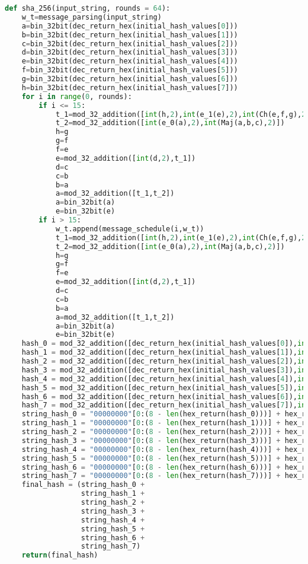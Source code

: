 \documentclass[12pt]{article}
\begin{document}
\begin{lstlisting}[language=Python]
def sha_256(input_string, rounds = 64):
    w_t=message_parsing(input_string)
    a=bin_32bit(dec_return_hex(initial_hash_values[0]))
    b=bin_32bit(dec_return_hex(initial_hash_values[1]))
    c=bin_32bit(dec_return_hex(initial_hash_values[2]))
    d=bin_32bit(dec_return_hex(initial_hash_values[3]))
    e=bin_32bit(dec_return_hex(initial_hash_values[4]))
    f=bin_32bit(dec_return_hex(initial_hash_values[5]))
    g=bin_32bit(dec_return_hex(initial_hash_values[6]))
    h=bin_32bit(dec_return_hex(initial_hash_values[7]))
    for i in range(0, rounds):
        if i <= 15: 
            t_1=mod_32_addition([int(h,2),int(e_1(e),2),int(Ch(e,f,g),2),int(sha_256_constants[i],16),int(w_t[i],2)])
            t_2=mod_32_addition([int(e_0(a),2),int(Maj(a,b,c),2)])
            h=g
            g=f
            f=e
            e=mod_32_addition([int(d,2),t_1])
            d=c
            c=b
            b=a 
            a=mod_32_addition([t_1,t_2])
            a=bin_32bit(a)
            e=bin_32bit(e)
        if i > 15:
            w_t.append(message_schedule(i,w_t))
            t_1=mod_32_addition([int(h,2),int(e_1(e),2),int(Ch(e,f,g),2),int(sha_256_constants[i],16),int(w_t[i],2)])
            t_2=mod_32_addition([int(e_0(a),2),int(Maj(a,b,c),2)])
            h=g
            g=f
            f=e
            e=mod_32_addition([int(d,2),t_1])
            d=c
            c=b
            b=a 
            a=mod_32_addition([t_1,t_2])
            a=bin_32bit(a)
            e=bin_32bit(e)
    hash_0 = mod_32_addition([dec_return_hex(initial_hash_values[0]),int(a,2)])
    hash_1 = mod_32_addition([dec_return_hex(initial_hash_values[1]),int(b,2)])
    hash_2 = mod_32_addition([dec_return_hex(initial_hash_values[2]),int(c,2)])
    hash_3 = mod_32_addition([dec_return_hex(initial_hash_values[3]),int(d,2)])
    hash_4 = mod_32_addition([dec_return_hex(initial_hash_values[4]),int(e,2)])
    hash_5 = mod_32_addition([dec_return_hex(initial_hash_values[5]),int(f,2)])
    hash_6 = mod_32_addition([dec_return_hex(initial_hash_values[6]),int(g,2)])
    hash_7 = mod_32_addition([dec_return_hex(initial_hash_values[7]),int(h,2)])
    string_hash_0 = "00000000"[0:(8 - len(hex_return(hash_0)))] + hex_return(hash_0)
    string_hash_1 = "00000000"[0:(8 - len(hex_return(hash_1)))] + hex_return(hash_1)
    string_hash_2 = "00000000"[0:(8 - len(hex_return(hash_2)))] + hex_return(hash_2)
    string_hash_3 = "00000000"[0:(8 - len(hex_return(hash_3)))] + hex_return(hash_3)
    string_hash_4 = "00000000"[0:(8 - len(hex_return(hash_4)))] + hex_return(hash_4)
    string_hash_5 = "00000000"[0:(8 - len(hex_return(hash_5)))] + hex_return(hash_5)
    string_hash_6 = "00000000"[0:(8 - len(hex_return(hash_6)))] + hex_return(hash_6)
    string_hash_7 = "00000000"[0:(8 - len(hex_return(hash_7)))] + hex_return(hash_7)
    final_hash = (string_hash_0 +
                  string_hash_1 +
                  string_hash_2 +
                  string_hash_3 +
                  string_hash_4 +
                  string_hash_5 +
                  string_hash_6 +
                  string_hash_7)
    return(final_hash)


\end{lstlisting}
\end{document}
